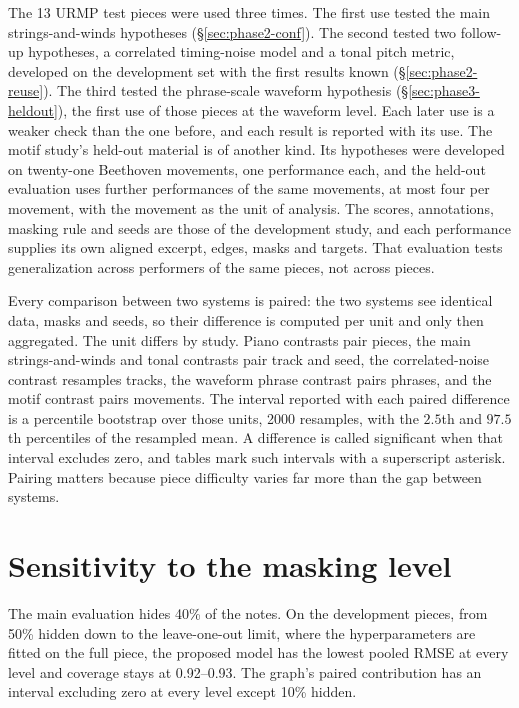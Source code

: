 \documentclass[11pt,a4paper]{report}
\newcommand{\maskRate}{40\%}
\begin{document}
The 13 URMP test pieces were used three times. The first use tested the
main strings-and-winds hypotheses (\S\ref{sec:phase2-conf}). The second
tested two follow-up hypotheses, a correlated timing-noise model and a tonal
pitch metric, developed on the development set with the first results known
(\S\ref{sec:phase2-reuse}). The third tested the phrase-scale waveform
hypothesis (\S\ref{sec:phase3-heldout}), the first use of those pieces at the
waveform level. Each later use is a weaker check than the one before, and
each result is reported with its use. The motif study's held-out material is
of another kind. Its hypotheses were developed on twenty-one Beethoven
movements, one performance each, and the held-out evaluation uses further
performances of the same movements, at most four per movement, with the
movement as the unit of analysis. The scores, annotations, masking rule and
seeds are those of the development study, and each performance supplies its
own aligned excerpt, edges, masks and targets. That evaluation tests
generalization across performers of the same pieces, not across pieces.

Every comparison between two systems is paired: the two systems see
identical data, masks and seeds, so their difference is computed per unit
and only then aggregated. The unit differs by study. Piano contrasts pair
pieces, the main strings-and-winds and tonal contrasts pair track and seed,
the correlated-noise contrast resamples tracks, the waveform phrase contrast
pairs phrases, and the motif contrast pairs movements. The interval reported
with each paired difference is a percentile bootstrap over those units,
2000 resamples, with the $2.5$th and $97.5$th percentiles of the resampled
mean. A difference is called significant when that interval
excludes zero, and tables mark such intervals with a superscript asterisk.
Pairing matters because piece difficulty varies far more than the gap
between systems.

\section{Sensitivity to the masking level}\label{sec:masksweep}
The main evaluation hides \maskRate{} of the notes. On the development
pieces, from 50\% hidden down to the leave-one-out limit, where the
hyperparameters are fitted on the full piece, the proposed model has the
lowest pooled RMSE at every level and coverage stays at 0.92--0.93. The
graph's paired contribution has an interval excluding zero at every level
except 10\% hidden.
\end{document}
